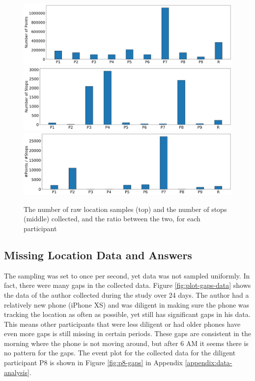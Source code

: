 \begin{figure}
    \centering
    \includegraphics[width=\textwidth]{images/study/storage/num_points.png}
    \includegraphics[width=\textwidth]{images/study/storage/num_stops.png}
    \includegraphics[width=\textwidth]{images/study/storage/compression_N.png}
    \caption{The number of raw location samples (top) and the number of stops (middle) collected, and the ratio between the two, for each participant}
    \label{fig:plot-num-points-stops}
\end{figure}


\subsection{Missing Location Data and Answers}
The sampling was set to once per second, yet data was not sampled uniformly. In fact, there were many gaps in the collected data. Figure \ref{fig:plot-gaps-data} shows the data of the author collected during the study over 24 days. The author had a relatively new phone (iPhone XS) and was diligent in making sure the phone was tracking the location as often as possible, yet still has significant gaps in his data. This means other participants that were less diligent or had older phones have even more gaps is still missing in certain periods. These gaps are consistent in the morning where the phone is not moving around, but after 6 AM it seems there is no pattern for the gaps. The event plot for the collected data for the diligent participant P8 is shown in Figure \ref{fig:p8-gaps} in Appendix \ref{appendix:data-analysis}. \\

